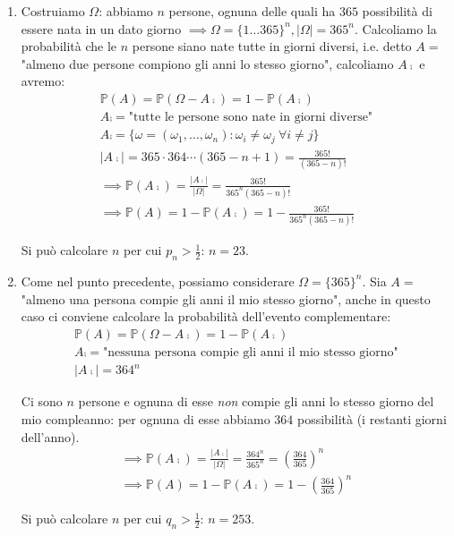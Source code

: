 \begin{enumerate}
\item Costruiamo $\Omega $: abbiamo $n$ persone, ognuna delle quali ha $365$ possibilità di essere nata in un dato giorno $\implies \Omega =\{1\dots 365\}^{n} ,| \Omega | =365^{n}$. Calcoliamo la probabilità che le $n$ persone siano nate tutte in giorni diversi, i.e. detto $A=$ "almeno due persone compiono gli anni lo stesso giorno", calcoliamo $A\comp$ e avremo:\begin{equation*}
\begin{array}{ l }
\mathbb{P}( A) =\mathbb{P}\left( \Omega -A\comp\right) =1-\mathbb{P}\left( A\comp\right)\\
A\comp =\text{"tutte le persone sono nate in giorni diverse"}\\
A\comp =\{\omega =( \omega _{1} ,\dots ,\omega _{n}) :\omega _{i} \neq \omega _{j} \ \forall i\neq j\}\\
\left| A\comp\right| =365\cdot 364\cdots ( 365-n+1) =\frac{365!}{( 365-n) !}\\
\implies \mathbb{P}\left( A\comp\right) =\frac{\left| A\comp\right| }{| \Omega | } =\frac{365!}{365^{n}( 365-n) !}\\
\implies \mathbb{P}( A) =1-\mathbb{P}\left( A\comp\right) =1-\frac{365!}{365^{n}( 365-n) !}
\end{array}
\end{equation*}

Si può calcolare $n$ per cui $p_{n}  >\frac{1}{2}$: $n=23$.
\item Come nel punto precedente, possiamo considerare $\Omega =\{365\}^{n}$. Sia $A=$ "almeno una persona compie gli anni il mio stesso giorno", anche in questo caso ci conviene calcolare la probabilità dell'evento complementare:\begin{equation*}
\begin{array}{ l }
\mathbb{P}( A) =\mathbb{P}\left( \Omega -A\comp\right) =1-\mathbb{P}\left( A\comp\right)\\
A\comp =\text{"nessuna persona compie gli anni il mio stesso giorno"}\\
\left| A\comp\right| =364^{n}
\end{array}
\end{equation*}

Ci sono $n$ persone e ognuna di esse \textit{non} compie gli anni lo stesso giorno del mio compleanno: per ognuna di esse abbiamo $364$ possibilità (i restanti giorni dell'anno).\begin{equation*}
\begin{array}{ l }
\implies \mathbb{P}\left( A\comp\right) =\frac{\left| A\comp\right| }{| \Omega | } =\frac{364^{n}}{365^{n}} =\left(\frac{364}{365}\right)^{n}\\
\implies \mathbb{P}( A) =1-\mathbb{P}\left( A\comp\right) =1-\left(\frac{364}{365}\right)^{n}
\end{array}
\end{equation*}

Si può calcolare $n$ per cui $q_{n}  >\frac{1}{2}$: $n=253$.
\end{enumerate}
\Soluzione

